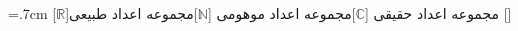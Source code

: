 \thispagestyle{plain}
\begin{multicols*}{2}
\begin{acronym}[\lr{CPU}]
\baselineskip=.7cm
[$\mathbb{R}$]{مجموعه اعداد حقیقی}
[$\mathbb{C}$]{مجموعه اعداد موهومی}
[$\mathbb{N}$]{مجموعه اعداد طبیعی}
[]{}
\end{acronym}
\end{multicols*}

\cleardoublepage

